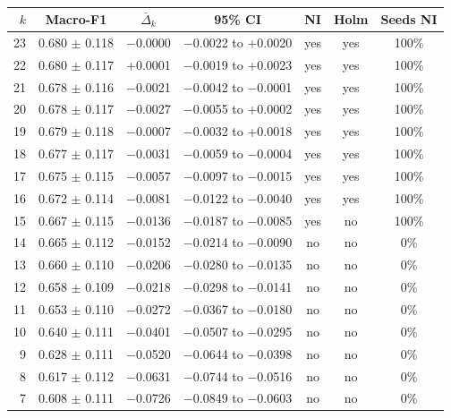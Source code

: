 \begin{table}[t]
\centering
\small
\caption{}
\label{tab:putemg}
\begin{tabular}{rcccccc}
\toprule
$k$ & Macro-F1 & $\bar\Delta_k$ & 95\% CI & NI & Holm & Seeds NI \\
\midrule
23 & 0.680 $\pm$ 0.118 & $-$0.0000 & $-$0.0022 to +0.0020 & yes & yes & 100\% \\
22 & 0.680 $\pm$ 0.117 & +0.0001 & $-$0.0019 to +0.0023 & yes & yes & 100\% \\
21 & 0.678 $\pm$ 0.116 & $-$0.0021 & $-$0.0042 to $-$0.0001 & yes & yes & 100\% \\
20 & 0.678 $\pm$ 0.117 & $-$0.0027 & $-$0.0055 to +0.0002 & yes & yes & 100\% \\
19 & 0.679 $\pm$ 0.118 & $-$0.0007 & $-$0.0032 to +0.0018 & yes & yes & 100\% \\
18 & 0.677 $\pm$ 0.117 & $-$0.0031 & $-$0.0059 to $-$0.0004 & yes & yes & 100\% \\
17 & 0.675 $\pm$ 0.115 & $-$0.0057 & $-$0.0097 to $-$0.0015 & yes & yes & 100\% \\
16 & 0.672 $\pm$ 0.114 & $-$0.0081 & $-$0.0122 to $-$0.0040 & yes & yes & 100\% \\
15 & 0.667 $\pm$ 0.115 & $-$0.0136 & $-$0.0187 to $-$0.0085 & yes & no & 100\% \\
14 & 0.665 $\pm$ 0.112 & $-$0.0152 & $-$0.0214 to $-$0.0090 & no & no & 0\% \\
13 & 0.660 $\pm$ 0.110 & $-$0.0206 & $-$0.0280 to $-$0.0135 & no & no & 0\% \\
12 & 0.658 $\pm$ 0.109 & $-$0.0218 & $-$0.0298 to $-$0.0141 & no & no & 0\% \\
11 & 0.653 $\pm$ 0.110 & $-$0.0272 & $-$0.0367 to $-$0.0180 & no & no & 0\% \\
10 & 0.640 $\pm$ 0.111 & $-$0.0401 & $-$0.0507 to $-$0.0295 & no & no & 0\% \\
9 & 0.628 $\pm$ 0.111 & $-$0.0520 & $-$0.0644 to $-$0.0398 & no & no & 0\% \\
8 & 0.617 $\pm$ 0.112 & $-$0.0631 & $-$0.0744 to $-$0.0516 & no & no & 0\% \\
7 & 0.608 $\pm$ 0.111 & $-$0.0726 & $-$0.0849 to $-$0.0603 & no & no & 0\% \\

\end{tabular}
\end{table}
